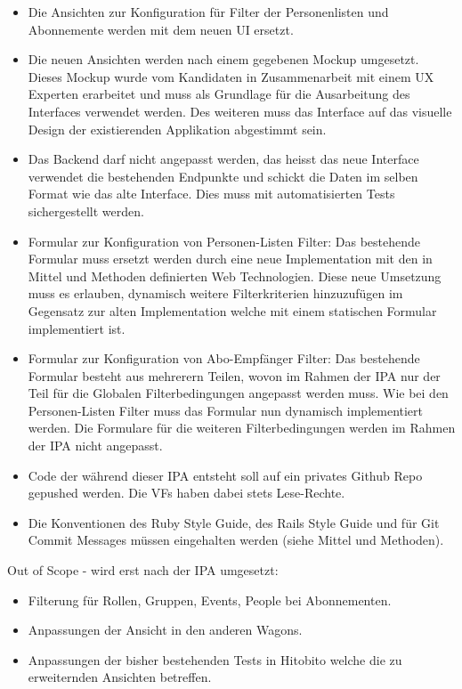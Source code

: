 \begin{itemize}
    \item Die Ansichten zur Konfiguration für Filter der Personenlisten und Abonnemente werden mit dem neuen UI ersetzt.
    \item Die neuen Ansichten werden nach einem gegebenen Mockup umgesetzt. Dieses Mockup wurde vom Kandidaten in Zusammenarbeit mit einem UX Experten erarbeitet und muss als Grundlage für die Ausarbeitung des Interfaces verwendet werden. Des weiteren muss das Interface auf das visuelle Design der existierenden Applikation abgestimmt sein.
    \item Das Backend darf nicht angepasst werden, das heisst das neue Interface verwendet die bestehenden Endpunkte und schickt die Daten im selben Format wie das alte Interface. Dies muss mit automatisierten Tests sichergestellt werden.
    \item Formular zur Konfiguration von Personen-Listen Filter: Das bestehende Formular muss ersetzt werden durch eine neue Implementation mit den in Mittel und Methoden definierten Web Technologien. Diese neue Umsetzung muss es erlauben, dynamisch weitere Filterkriterien hinzuzufügen im Gegensatz zur alten Implementation welche mit einem statischen Formular implementiert ist.
    \item Formular zur Konfiguration von Abo-Empfänger Filter: Das bestehende Formular besteht aus mehrerern Teilen, wovon im Rahmen der IPA nur der Teil für die Globalen Filterbedingungen angepasst werden muss. Wie bei den Personen-Listen Filter muss das Formular nun dynamisch implementiert werden. Die Formulare für die weiteren Filterbedingungen werden im Rahmen der IPA nicht angepasst. 
    \item Code der während dieser IPA entsteht soll auf ein privates Github Repo gepushed werden. Die VFs haben dabei stets Lese-Rechte.
    \item Die Konventionen des Ruby Style Guide, des Rails Style Guide und für Git Commit Messages müssen eingehalten werden (siehe Mittel und Methoden).
\end{itemize}

\newpage

Out of Scope - wird erst nach der IPA umgesetzt:

\begin{itemize}
    \item Filterung für Rollen, Gruppen, Events, People bei Abonnementen.
    \item Anpassungen der Ansicht in den anderen Wagons.
    \item Anpassungen der bisher bestehenden Tests in Hitobito welche die zu erweiternden Ansichten betreffen.
\end{itemize}

